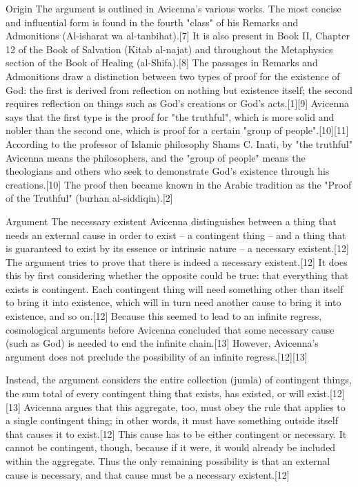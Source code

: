 Origin
The argument is outlined in Avicenna's various works. The most concise and influential form is found in the fourth "class" of his Remarks and Admonitions (Al-isharat wa al-tanbihat).[7] It is also present in Book II, Chapter 12 of the Book of Salvation (Kitab al-najat) and throughout the Metaphysics section of the Book of Healing (al-Shifa).[8] The passages in Remarks and Admonitions draw a distinction between two types of proof for the existence of God: the first is derived from reflection on nothing but existence itself; the second requires reflection on things such as God's creations or God's acts.[1][9] Avicenna says that the first type is the proof for "the truthful", which is more solid and nobler than the second one, which is proof for a certain "group of people".[10][11] According to the professor of Islamic philosophy Shams C. Inati, by "the truthful" Avicenna means the philosophers, and the "group of people" means the theologians and others who seek to demonstrate God's existence through his creations.[10] The proof then became known in the Arabic tradition as the "Proof of the Truthful" (burhan al-siddiqin).[2]

Argument
The necessary existent
Avicenna distinguishes between a thing that needs an external cause in order to exist – a contingent thing – and a thing that is guaranteed to exist by its essence or intrinsic nature – a necessary existent.[12] The argument tries to prove that there is indeed a necessary existent.[12] It does this by first considering whether the opposite could be true: that everything that exists is contingent. Each contingent thing will need something other than itself to bring it into existence, which will in turn need another cause to bring it into existence, and so on.[12] Because this seemed to lead to an infinite regress, cosmological arguments before Avicenna concluded that some necessary cause (such as God) is needed to end the infinite chain.[13] However, Avicenna's argument does not preclude the possibility of an infinite regress.[12][13]

Instead, the argument considers the entire collection (jumla) of contingent things, the sum total of every contingent thing that exists, has existed, or will exist.[12][13] Avicenna argues that this aggregate, too, must obey the rule that applies to a single contingent thing; in other words, it must have something outside itself that causes it to exist.[12] This cause has to be either contingent or necessary. It cannot be contingent, though, because if it were, it would already be included within the aggregate. Thus the only remaining possibility is that an external cause is necessary, and that cause must be a necessary existent.[12]

